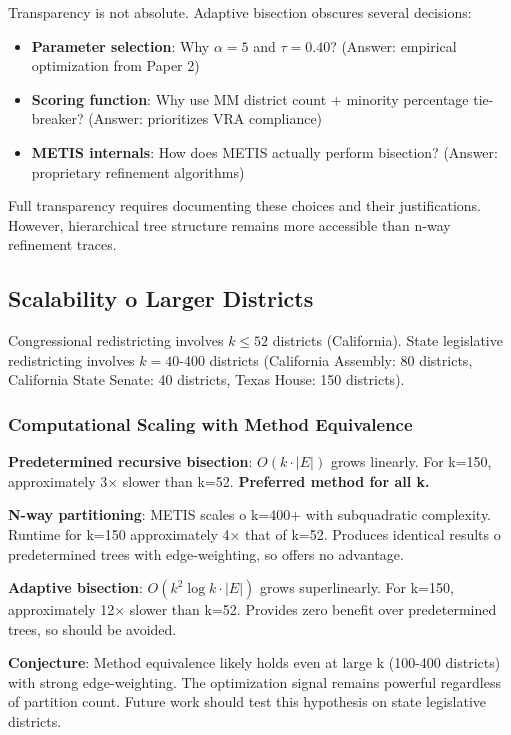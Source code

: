 Transparency is not absolute. Adaptive bisection obscures several decisions:
\begin{itemize}
\item \textbf{Parameter selection}: Why $\alpha = 5$ and $\tau = 0.40$? (Answer: empirical optimization from Paper 2)
\item \textbf{Scoring function}: Why use MM district count + minority percentage tie-breaker? (Answer: prioritizes VRA compliance)
\item \textbf{METIS internals}: How does METIS actually perform bisection? (Answer: proprietary refinement algorithms)
\end{itemize}

Full transparency requires documenting these choices and their justifications. However, hierarchical tree structure remains more accessible than n-way refinement traces.

\subsection{Scalability 	o Larger Districts}

Congressional redistricting involves $k \leq 52$ districts (California). State legislative redistricting involves $k = 40$-400 districts (California Assembly: 80 districts, California State Senate: 40 districts, Texas House: 150 districts).

\subsubsection{Computational Scaling with Method Equivalence}

\textbf{Predetermined recursive bisection}: $O(k \cdot |E|)$ grows linearly. For k=150, approximately 3× slower than k=52. \textbf{Preferred method for all k.}

\textbf{N-way partitioning}: METIS scales 	o k=400+ with subquadratic complexity. Runtime for k=150 approximately 4× that of k=52. Produces identical results 	o predetermined trees with edge-weighting, so offers no advantage.

\textbf{Adaptive bisection}: $O(k^2 \log k \cdot |E|)$ grows superlinearly. For k=150, approximately 12× slower than k=52. Provides zero benefit over predetermined trees, so should be avoided.

\textbf{Conjecture}: Method equivalence likely holds even at large k (100-400 districts) with strong edge-weighting. The optimization signal remains powerful regardless of partition count. Future work should test this hypothesis on state legislative districts.

